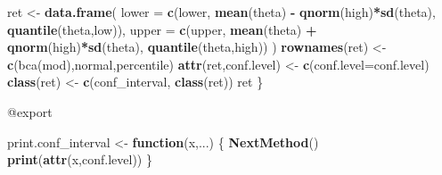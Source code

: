 \documentclass[
]{article}
\newenvironment{Shaded}{\begin{snugshade}}{\end{snugshade}}
\newcommand{\AttributeTok}[1]{\textcolor[rgb]{0.13,0.29,0.53}{#1}}
\newcommand{\ControlFlowTok}[1]{\textcolor[rgb]{0.13,0.29,0.53}{\textbf{#1}}}
\newcommand{\FunctionTok}[1]{\textcolor[rgb]{0.13,0.29,0.53}{\textbf{#1}}}
\newcommand{\NormalTok}[1]{#1}
\newcommand{\OtherTok}[1]{\textcolor[rgb]{0.56,0.35,0.01}{#1}}
\newcommand{\SpecialCharTok}[1]{\textcolor[rgb]{0.81,0.36,0.00}{\textbf{#1}}}
\newcommand{\StringTok}[1]{\textcolor[rgb]{0.31,0.60,0.02}{#1}}
\begin{document}
\begin{Shaded}
\begin{Highlighting}[]
\NormalTok{  ret }\OtherTok{\textless{}{-}} \FunctionTok{data.frame}\NormalTok{(}
    \AttributeTok{lower =} \FunctionTok{c}\NormalTok{(lower, }\FunctionTok{mean}\NormalTok{(theta) }\SpecialCharTok{{-}} \FunctionTok{qnorm}\NormalTok{(high)}\SpecialCharTok{*}\FunctionTok{sd}\NormalTok{(theta), }\FunctionTok{quantile}\NormalTok{(theta,low)),}
    \AttributeTok{upper =} \FunctionTok{c}\NormalTok{(upper, }\FunctionTok{mean}\NormalTok{(theta) }\SpecialCharTok{+} \FunctionTok{qnorm}\NormalTok{(high)}\SpecialCharTok{*}\FunctionTok{sd}\NormalTok{(theta), }\FunctionTok{quantile}\NormalTok{(theta,high))}
\NormalTok{  )}
  \FunctionTok{rownames}\NormalTok{(ret) }\OtherTok{\textless{}{-}} \FunctionTok{c}\NormalTok{(}\StringTok{\textquotesingle{}bca(mod)\textquotesingle{}}\NormalTok{,}\StringTok{\textquotesingle{}normal\textquotesingle{}}\NormalTok{,}\StringTok{\textquotesingle{}percentile\textquotesingle{}}\NormalTok{)}
  \FunctionTok{attr}\NormalTok{(ret,}\StringTok{\textquotesingle{}conf.level\textquotesingle{}}\NormalTok{) }\OtherTok{\textless{}{-}} \FunctionTok{c}\NormalTok{(}\AttributeTok{conf.level=}\NormalTok{conf.level) }
  \FunctionTok{class}\NormalTok{(ret) }\OtherTok{\textless{}{-}} \FunctionTok{c}\NormalTok{(}\StringTok{\textquotesingle{}conf\_interval\textquotesingle{}}\NormalTok{, }\FunctionTok{class}\NormalTok{(ret))}
\NormalTok{  ret}
\NormalTok{\}}
\end{Highlighting}
\end{Shaded}

@export

\begin{Shaded}
\begin{Highlighting}[]
\NormalTok{print.conf\_interval }\OtherTok{\textless{}{-}} \ControlFlowTok{function}\NormalTok{(x,...) \{}
  \FunctionTok{NextMethod}\NormalTok{()}
  \FunctionTok{print}\NormalTok{(}\FunctionTok{attr}\NormalTok{(x,}\StringTok{\textquotesingle{}conf.level\textquotesingle{}}\NormalTok{))}
\NormalTok{\}}
\end{Highlighting}
\end{Shaded}
\end{document}
